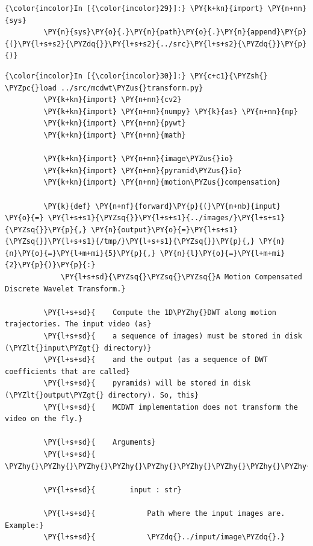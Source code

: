     \begin{Verbatim}[commandchars=\\\{\}]
{\color{incolor}In [{\color{incolor}29}]:} \PY{k+kn}{import} \PY{n+nn}{sys}
         \PY{n}{sys}\PY{o}{.}\PY{n}{path}\PY{o}{.}\PY{n}{append}\PY{p}{(}\PY{l+s+s2}{\PYZdq{}}\PY{l+s+s2}{../src}\PY{l+s+s2}{\PYZdq{}}\PY{p}{)}
\end{Verbatim}


    \begin{Verbatim}[commandchars=\\\{\}]
{\color{incolor}In [{\color{incolor}30}]:} \PY{c+c1}{\PYZsh{} \PYZpc{}load ../src/mcdwt\PYZus{}transform.py}
         \PY{k+kn}{import} \PY{n+nn}{cv2}
         \PY{k+kn}{import} \PY{n+nn}{numpy} \PY{k}{as} \PY{n+nn}{np}
         \PY{k+kn}{import} \PY{n+nn}{pywt}
         \PY{k+kn}{import} \PY{n+nn}{math}
         
         \PY{k+kn}{import} \PY{n+nn}{image\PYZus{}io}
         \PY{k+kn}{import} \PY{n+nn}{pyramid\PYZus{}io}
         \PY{k+kn}{import} \PY{n+nn}{motion\PYZus{}compensation}
         
         \PY{k}{def} \PY{n+nf}{forward}\PY{p}{(}\PY{n+nb}{input} \PY{o}{=} \PY{l+s+s1}{\PYZsq{}}\PY{l+s+s1}{../images/}\PY{l+s+s1}{\PYZsq{}}\PY{p}{,} \PY{n}{output}\PY{o}{=}\PY{l+s+s1}{\PYZsq{}}\PY{l+s+s1}{/tmp/}\PY{l+s+s1}{\PYZsq{}}\PY{p}{,} \PY{n}{n}\PY{o}{=}\PY{l+m+mi}{5}\PY{p}{,} \PY{n}{l}\PY{o}{=}\PY{l+m+mi}{2}\PY{p}{)}\PY{p}{:}
             \PY{l+s+sd}{\PYZsq{}\PYZsq{}\PYZsq{}A Motion Compensated Discrete Wavelet Transform.}
         
         \PY{l+s+sd}{    Compute the 1D\PYZhy{}DWT along motion trajectories. The input video (as}
         \PY{l+s+sd}{    a sequence of images) must be stored in disk (\PYZlt{}input\PYZgt{} directory)}
         \PY{l+s+sd}{    and the output (as a sequence of DWT coefficients that are called}
         \PY{l+s+sd}{    pyramids) will be stored in disk (\PYZlt{}output\PYZgt{} directory). So, this}
         \PY{l+s+sd}{    MCDWT implementation does not transform the video on the fly.}
         
         \PY{l+s+sd}{    Arguments}
         \PY{l+s+sd}{    \PYZhy{}\PYZhy{}\PYZhy{}\PYZhy{}\PYZhy{}\PYZhy{}\PYZhy{}\PYZhy{}\PYZhy{}}
         
         \PY{l+s+sd}{        input : str}
         
         \PY{l+s+sd}{            Path where the input images are. Example:}
         \PY{l+s+sd}{            \PYZdq{}../input/image\PYZdq{}.}
         

\end{Verbatim}
